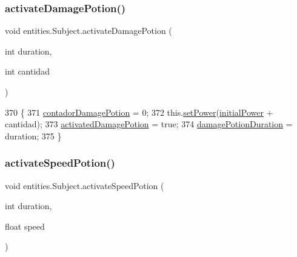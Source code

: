 \subsubsection{\texorpdfstring{activate\+Damage\+Potion()}{activateDamagePotion()}}
{\footnotesize\ttfamily void entities.\+Subject.\+activate\+Damage\+Potion (\begin{DoxyParamCaption}\item[{int}]{duration,  }\item[{int}]{cantidad }\end{DoxyParamCaption})\hspace{0.3cm}{\ttfamily [inline]}}


\begin{DoxyCode}
370                                                                  \{
371         \mbox{\hyperlink{classentities_1_1_subject_a549beb50154a4d53c53124ea79a4d740}{contadorDamagePotion}} = 0;
372         this.\mbox{\hyperlink{classentities_1_1_subject_a5f56d102b27182353d53e68d7459273a}{setPower}}(\mbox{\hyperlink{classentities_1_1_subject_a3c94d6a59743309345b5da2ee7eeb0ec}{initialPower}} + cantidad);
373         \mbox{\hyperlink{classentities_1_1_subject_a3609265fa27777d39b14f1a7f9f7cbb3}{activatedDamagePotion}} = \textcolor{keyword}{true};
374         \mbox{\hyperlink{classentities_1_1_subject_a5f16593520da1120bdbf179d22af603b}{damagePotionDuration}} = duration;
375     \}
\end{DoxyCode}
\mbox{\label{classentities_1_1_subject_a882e12cd6888cb29f8aab5e34993fd7e}} 
\subsubsection{\texorpdfstring{activate\+Speed\+Potion()}{activateSpeedPotion()}}
{\footnotesize\ttfamily void entities.\+Subject.\+activate\+Speed\+Potion (\begin{DoxyParamCaption}\item[{int}]{duration,  }\item[{float}]{speed }\end{DoxyParamCaption})\hspace{0.3cm}{\ttfamily [inline]}}


